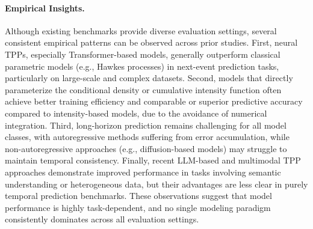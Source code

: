 \documentclass[10pt]{article} %
\begin{document}
\paragraph{Empirical Insights.}
Although existing benchmarks provide diverse evaluation settings, several consistent empirical patterns can be observed across prior studies. 
First, neural TPPs, especially Transformer-based models, generally outperform classical parametric models (e.g., Hawkes processes) in next-event prediction tasks, particularly on large-scale and complex datasets. 
Second, models that directly parameterize the conditional density or cumulative intensity function often achieve better training efficiency and comparable or superior predictive accuracy compared to intensity-based models, due to the avoidance of numerical integration. 
Third, long-horizon prediction remains challenging for all model classes, with autoregressive methods suffering from error accumulation, while non-autoregressive approaches (e.g., diffusion-based models) may struggle to maintain temporal consistency. 
Finally, recent LLM-based and multimodal TPP approaches demonstrate improved performance in tasks involving semantic understanding or heterogeneous data, but their advantages are less clear in purely temporal prediction benchmarks. 
These observations suggest that model performance is highly task-dependent, and no single modeling paradigm consistently dominates across all evaluation settings.

\end{document}

